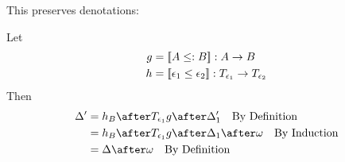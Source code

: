 {    This preserves denotations:
    
    Let
    \begin{align}
        g &= {\bf [\![}A \leq: B{\bf ]\!]}: A \rightarrow B\\
        h &= {\bf [\![}\epsilon_1\leq\epsilon_2{\bf ]\!]}: T_{\epsilon_1}{}\rightarrow T_{\epsilon_2}{}
    \end{align}
    Then
    \begin{align}
        \D' & = h_B\after\T{\e_1}{g}\after \D_1' \qt{By Definition}\\
        & = h_B\after\T{\e_1}{g}\after \D_1\after\w\qt{By Induction}\\
        & = \D\after\w\qt{By Definition}
    \end{align}
}

\ifdefined\NoDocument
\else
\documentclass{report}


   \Weakening

\fi
